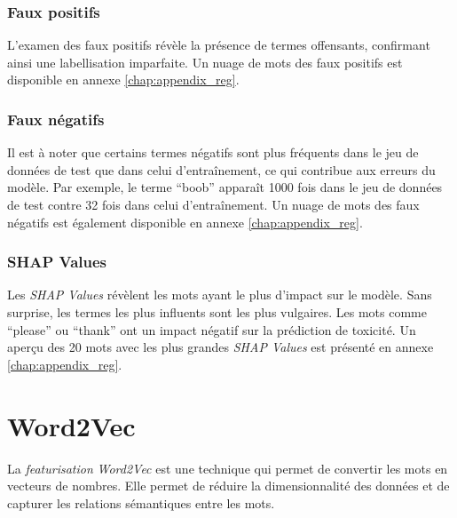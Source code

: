 \subsubsection{Faux positifs}
L'examen des faux positifs révèle la présence de termes offensants, confirmant ainsi une labellisation imparfaite. 
Un nuage de mots des faux positifs est disponible en annexe \ref{chap:appendix_reg}.

\subsubsection{Faux négatifs}
Il est à noter que certains termes négatifs sont plus fréquents dans le jeu de données de test que dans celui d'entraînement, ce qui contribue aux erreurs du modèle.
Par exemple, le terme ``boob'' apparaît 1000 fois dans le jeu de données de test contre 32 fois dans celui d'entraînement. 
Un nuage de mots des faux négatifs est également disponible en annexe \ref{chap:appendix_reg}.

\subsubsection{SHAP Values}
Les \textit{SHAP Values} révèlent les mots ayant le plus d'impact sur le modèle. 
Sans surprise, les termes les plus influents sont les plus vulgaires. Les mots comme ``please'' ou ``thank'' ont un impact négatif sur la prédiction de toxicité.
Un aperçu des 20 mots avec les plus grandes \textit{SHAP Values} est présenté en annexe \ref{chap:appendix_reg}.

\newpage
\section{Word2Vec}
La \textit{featurisation} \textit{Word2Vec} est une technique qui permet de convertir les mots en vecteurs de nombres. 
Elle permet de réduire la dimensionnalité des données et de capturer les relations sémantiques entre les mots.


